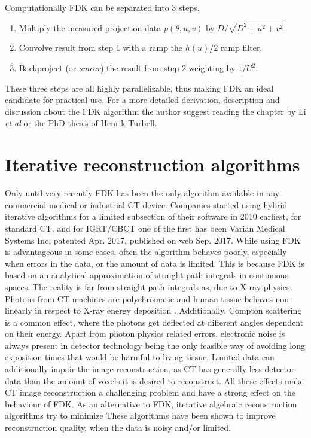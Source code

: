 Computationally FDK can be separated into 3 steps. 

\begin{enumerate}
\item Multiply the measured projection data $p(\theta,u,v)$ by $D/\sqrt{D^2+u^2+v^2}$.
\item Convolve result from step 1 with a ramp the $h(u)/2$ ramp filter. 
\item Backproject (or \textit{smear}) the result from step 2 weighting by $1/U^2$.
\end{enumerate}

These three steps are all highly parallelizable, thus making FDK an ideal candidate for practical use. For a more detailed derivation, description and discussion about the FDK algorithm the author suggest reading the chapter by Li \textit{et al}\cite{CBCTbook} or the PhD thesis of Henrik Turbell\cite{turbell2001cone}. 


\section{Iterative reconstruction algorithms}
Only until very recently FDK has been the only algorithm available in any commercial medical or industrial CT device. Companies started using hybrid iterative algorithms for a limited subsection of their software in 2010 earliest\cite{geyer2015state}, for standard CT, and for IGRT/CBCT one of the first has been Varian Medical Systems Inc, patented Apr. 2017\cite{paysan2017iterative}, published on web Sep. 2017\cite{Varian}.  While using FDK is advantageous in some cases, often the algorithm behaves poorly, especially when errors in the data, or the amount of data is limited. This is because FDK is based on an analytical approximation of straight path integrals in continuous spaces. The reality is far from straight path integrals as, due to X-ray physics. Photons from CT machines are polychromatic and human tissue behaves non-linearly in respect to X-ray energy deposition . Additionally, Compton scattering is a common effect, where the photons get deflected at different angles dependent on their energy. Apart from photon physics related errors, electronic noise is always present in detector technology being the only feasible way of avoiding  long exposition times that would be harmful to living tissue. Limited data can additionally impair the image reconstruction, as CT has generally less detector data than the amount of voxels it is desired to reconstruct. All these effects make CT image reconstruction a challenging problem and have a strong effect on the behaviour of FDK. As an alternative to FDK, iterative algebraic reconstruction algorithms try to minimize  These algorithms have been shown to improve reconstruction quality,  when the data is noisy and/or limited. 

